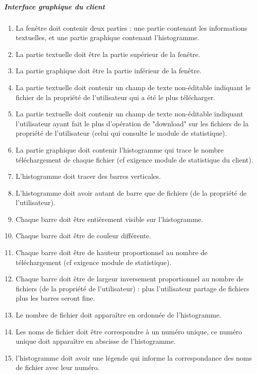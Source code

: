 \documentclass[10pt,a4paper]{report}
\begin{document}
	\subparagraph{Interface graphique du client}
		\begin{enumerate}

			\item La fenêtre doit contenir deux parties : une partie contenant les informations textuelles, et une partie graphique contenant l'histogramme.

			\item La partie textuelle doit être la partie supérieur de la fenêtre.

			\item La partie graphique doit être la partie inférieur de la fenêtre.

			\item La partie textuelle doit contenir un champ de texte non-éditable indiquant le fichier de la propriété de l'utilisateur qui a été le plus télécharger.

			\item La partie textuelle doit contenir un champ de texte non-éditable indiquant l'utilisateur ayant fait le plus d'opération de "download" sur les fichiers de la propriété de l'utilisateur (celui qui consulte le module de statistique).

			\item La partie graphique doit contenir l'histogramme qui trace le nombre téléchargement de chaque fichier (cf exigence module de statistique du client).

			\item L'histogramme doit tracer des barres verticales.

			\item L'histogramme doit avoir autant de barre que de fichiers (de la propriété de l'utilisateur).

			\item Chaque barre doit être entièrement visible sur l'histogramme.

			\item Chaque barre doit être de couleur différente.

			\item Chaque barre doit être de hauteur proportionnel au nombre de téléchargement (cf exigence module de statistique).

			\item Chaque barre doit être de largeur inversement proportionnel au nombre de fichiers (de la propriété de l'utilisateur) : plus l'utilisateur partage de fichiers plus les barres seront fine.

			\item Le nombre de fichier doit apparaître en ordonnée de l'histogramme.

			\item Les noms de fichier doit être correspondre à un numéro unique, ce numéro unique doit apparaître en abscisse de l'histogramme.

			\item l'histogramme doit avoir une légende qui informe la correspondance des noms de fichier avec leur numéro.
		\end{enumerate}
\end{document}
